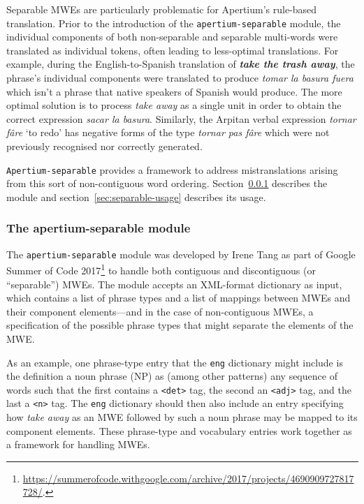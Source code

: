 \documentclass[free]{flammie}
\newcommand{\tag}[1]{\texttt{<#1>}}
\begin{document}
Separable MWEs are particularly problematic for Apertium's rule-based
translation. Prior to the introduction of the \texttt{apertium-separable}
module, the individual components of both non-separable and separable
multi-words were translated as individual tokens, often leading to less-optimal
translations. For example, during the English-to-Spanish translation of
\emph{\textbf{take the trash away}}, the phrase's individual components were
translated to produce \emph{tomar la basura fuera} which isn't a phrase that
native speakers of Spanish would produce. The more optimal solution is to
process \emph{take away} as a single unit in order to obtain the correct
expression \emph{sacar la basura}. Similarly, the Arpitan verbal expression
\emph{tornar fâre} `to redo' has negative forms of the type \emph{tornar pas
fâre} which were not previously recognised nor correctly generated.

\texttt{Apertium-separable} provides a framework to address mistranslations
arising from this sort of non-contiguous word ordering.
Section~\ref{sec:separable-module} describes the module and
section~\ref{sec:separable-usage} describes its usage.

\subsubsection{The apertium-separable module}\label{sec:separable-module}

The \texttt{apertium-separable} module was developed by Irene Tang as part of
Google Summer of Code
2017\footnote{\url{https://summerofcode.withgoogle.com/archive/2017/projects/4690909727817728/}.}
to handle both contiguous and discontiguous (or ``separable'') MWEs. The module
accepts an XML-format dictionary as input, which contains a list of phrase types
and a list of mappings between MWEs and their component elements---and in the
case of non-contiguous MWEs, a specification of the possible phrase types that
might separate the elements of the MWE.

As an example, one phrase-type entry that the \texttt{eng} dictionary might
include is the definition a noun phrase (NP) as (among other patterns) any
sequence of words such that the first contains a \tag{det} tag, the second an
\tag{adj} tag, and the last a \tag{n} tag. The \texttt{eng} dictionary should
then also include an entry specifying how \emph{take away} as an MWE followed by
such a noun phrase may be mapped to its component elements.  These phrase-type
and vocabulary entries work together as a framework for handling MWEs.
\end{document}
